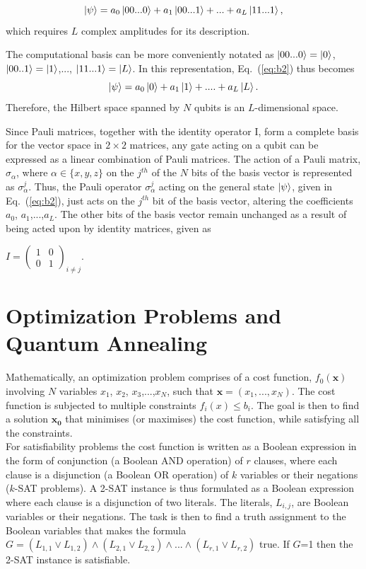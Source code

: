 \documentclass[../main.tex]{subfiles}
\begin{document}
\begin{equation}
\ket{\psi} =a_0 \ket{00...0}+a_1 \ket{00...1}+...+a_L \ket{11...1},
\label{eq:b2}
\end{equation}
which requires $L$ complex amplitudes for its description.

The computational basis can be more conveniently notated as $\ket{00...0}=\ket{0}$, $\ket{00..1}=\ket{1}$,..., $\ket{11...1}=\ket{L}$. In this representation, Eq.~(\ref{eq:b2}) thus becomes
\begin{equation}
\ket{\psi}= a_0\ket{0}+a_1\ket{1}+....+a_L\ket{L}.  \label{eq:b3}
\end{equation}
Therefore, the Hilbert space spanned by $N$ qubits is an $L$-dimensional space.

Since Pauli matrices, together with the identity operator I, form a complete basis for the vector space in $2 \times 2$ matrices, any gate acting on a qubit can be expressed as a linear combination of Pauli matrices. The action of a Pauli matrix, $\sigma_\alpha$, where $\alpha \in \{x,y,z\}$ on the $j^{th}$ of the $N$ bits of the basis vector is represented as $\sigma_\alpha^j$. Thus, the Pauli operator $\sigma_\alpha^j$ acting on the general state $\ket{\psi}$, given in Eq.~(\ref{eq:b2}), just acts on the $j^{th}$ bit of the basis vector, altering the coefficients $a_0$, $a_1$,...,$a_L$. The other bits of the basis vector remain unchanged as a result of being acted upon by identity matrices, given as
\begin{center}

 $I=\begin{pmatrix}
1&0\\
0&1
\end{pmatrix}_{i \neq j}
$.\\
\end{center}
\section{Optimization Problems and Quantum Annealing} 
Mathematically, an optimization problem comprises of a cost function, $f_0(\textbf{x})$ involving $N$ variables $x_1$, $x_2$, $x_3$,...,$x_N$, such that $\textbf{x}=(x_1,...,x_N)$. The cost function is subjected to multiple constraints $f_i(x) \leq b_i$. The goal is then to find a solution $\mathbf{x_0}$ that minimises (or maximises) the cost function, while satisfying all the constraints.\\

For satisfiability problems the cost function is written as a Boolean expression in the form of conjunction (a Boolean AND operation) of $r$ clauses, where each clause is a disjunction (a Boolean OR operation) of $k$ variables or their negations ($k$-SAT problems)\cite{boyd2004convex,hsu2018quantum,thomas2014quantum}. A 2-SAT instance is thus formulated as a Boolean expression where each clause is a disjunction of two literals. The literals, $L_{i,j}$, are Boolean variables or their negations. The task is then to find a truth assignment to the Boolean variables that makes the formula $G=(L_{1,1} \lor L_{1,2}) \land (L_{2,1} \lor L_{2,2}) \land ... \land (L_{r,1} \lor L_{r,2})$ true. If $G$=1 then the 2-SAT instance is satisfiable.
\end{document}
